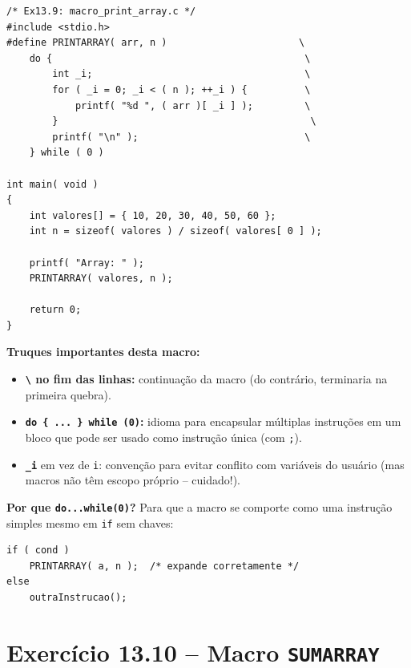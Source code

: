 \documentclass[12pt,a4paper]{article}
\begin{document}
\begin{respostabox}
\begin{lstlisting}
/* Ex13.9: macro_print_array.c */
#include <stdio.h>
#define PRINTARRAY( arr, n )                       \
    do {                                            \
        int _i;                                     \
        for ( _i = 0; _i < ( n ); ++_i ) {          \
            printf( "%d ", ( arr )[ _i ] );         \
        }                                            \
        printf( "\n" );                             \
    } while ( 0 )

int main( void )
{
    int valores[] = { 10, 20, 30, 40, 50, 60 };
    int n = sizeof( valores ) / sizeof( valores[ 0 ] );

    printf( "Array: " );
    PRINTARRAY( valores, n );

    return 0;
}
\end{lstlisting}

\textbf{Truques importantes desta macro:}
\begin{itemize}[noitemsep]
  \item \textbf{\texttt{\textbackslash} no fim das linhas:} continuação da macro
  (do contrário, terminaria na primeira quebra).
  \item \textbf{\texttt{do \{ ... \} while (0)}:} idioma para encapsular múltiplas
  instruções em um bloco que pode ser usado como instrução única (com \texttt{;}).
  \item \textbf{\texttt{\_i}} em vez de \texttt{i}: convenção para evitar
  conflito com variáveis do usuário (mas macros não têm escopo próprio --
  cuidado!).
\end{itemize}

\textbf{Por que \texttt{do...while(0)}?} Para que a macro se comporte como uma
instrução simples mesmo em \texttt{if} sem chaves:
\begin{lstlisting}
if ( cond )
    PRINTARRAY( a, n );  /* expande corretamente */
else
    outraInstrucao();
\end{lstlisting}
\end{respostabox}

\newpage

\section{Exercício 13.10 -- Macro \texttt{SUMARRAY}}
\end{document}
